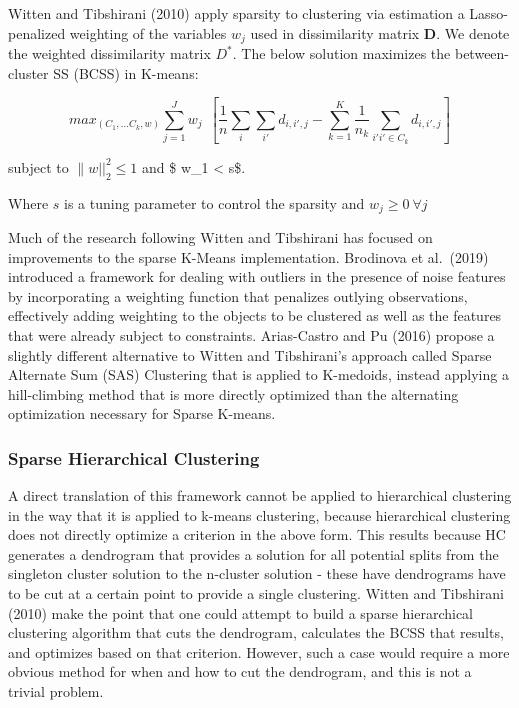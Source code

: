 \documentclass[
]{article}
\begin{document}
Witten and Tibshirani (2010) apply sparsity to clustering via estimation
a Lasso-penalized weighting of the variables \(w_j\) used in
dissimilarity matrix \textbf{D}. We denote the weighted dissimilarity
matrix \(D^*\). The below solution maximizes the between-cluster SS
(BCSS) in K-means:

\[ max_{(C_1,...C_k,w)} \sum_{j=1}^{J}w_j ~ ~[\frac{1}{n}\sum_{i} \sum_{i'} d_{i,i',j} - \sum_{k=1}^{K}\frac{1}{n_k}\sum_{i'i' \in C_k}d_{i,i',j}]\]

subject to \(\|w||_{2}^{2} \leq 1\) and \$
\textbar\textbar w\textbar\textbar\_1 \textless{} s\$.

Where \(s\) is a tuning parameter to control the sparsity and
\(w_j \geq 0 ~ \forall j\)

Much of the research following Witten and Tibshirani has focused on
improvements to the sparse K-Means implementation. Brodinova et
al.~(2019) introduced a framework for dealing with outliers in the
presence of noise features by incorporating a weighting function that
penalizes outlying observations, effectively adding weighting to the
objects to be clustered as well as the features that were already
subject to constraints. Arias-Castro and Pu (2016) propose a slightly
different alternative to Witten and Tibshirani's approach called Sparse
Alternate Sum (SAS) Clustering that is applied to K-medoids, instead
applying a hill-climbing method that is more directly optimized than the
alternating optimization necessary for Sparse K-means.

\hypertarget{sparse-hierarchical-clustering}{%
\subsubsection{Sparse Hierarchical
Clustering}\label{sparse-hierarchical-clustering}}

A direct translation of this framework cannot be applied to hierarchical
clustering in the way that it is applied to k-means clustering, because
hierarchical clustering does not directly optimize a criterion in the
above form. This results because HC generates a dendrogram that provides
a solution for all potential splits from the singleton cluster solution
to the n-cluster solution - these have dendrograms have to be cut at a
certain point to provide a single clustering. Witten and Tibshirani
(2010) make the point that one could attempt to build a sparse
hierarchical clustering algorithm that cuts the dendrogram, calculates
the BCSS that results, and optimizes based on that criterion. However,
such a case would require a more obvious method for when and how to cut
the dendrogram, and this is not a trivial problem.
\end{document}
